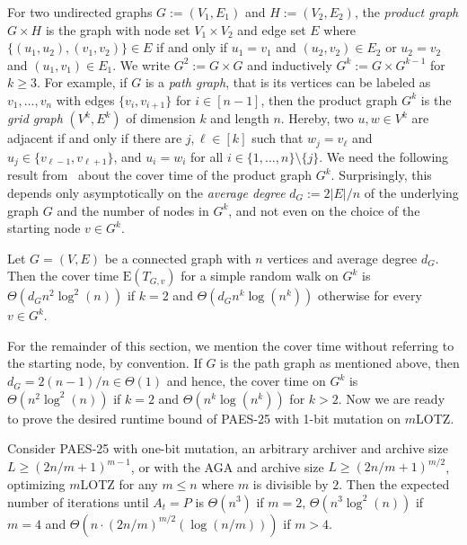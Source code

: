 \documentclass[
sigconf = false, %
review = false, %
screen = true, %
anonymous = true, %
format=acmsmall
]{acmart}
\newcommand{\mLOTZ}{\ensuremath{m}\text{-}\textsc{LOTZ}\xspace}
\newcommand*{\E}{\mathrm{E}}
\newcommand{\PAES}{PAES-25\xspace}
\begin{document}
For two undirected graphs $G:=(V_1,E_1)$ and $H:=(V_2,E_2)$, the \emph{product graph} $G \times H$ is the graph with node set $V_1 \times V_2$ and edge set $E$ where $\{(u_1,u_2),(v_1,v_2)\} \in E$ if and only if $u_1=v_1$ and $(u_2,v_2) \in E_2$ or $u_2 = v_2$ and $(u_1,v_1) \in E_1$. We write $G^2:=G \times G$ and inductively $G^k:=G \times G^{k-1}$ for $k \geq 3$. For example, if $G$ is a \emph{path graph}, that is its vertices can be labeled as $v_1, \ldots , v_n$ with edges $\{v_i,v_{i+1}\}$ for $i \in [n-1]$, then the product graph $G^k$ is the \emph{grid graph} $(V^k,E^k)$ of dimension $k$ and length $n$. Hereby, two $u,w \in V^k$ are adjacent if and only if there are $j,\ell \in [k]$ such that $w_j=v_\ell$ and $u_j \in \{v_{\ell-1},v_{\ell+1}\}$, and $u_i=w_i$ for all $i \in \{1,\ldots , n\} \setminus \{j\}$. We need the following result from~\citet{JONASSON2000181} about the cover time of the product graph $G^k$. Surprisingly, this depends only asymptotically on the \emph{average degree} $d_G:=2|E|/n$ of the underlying graph $G$ and the number of nodes in $G^k$, and not even on the choice of the starting node $v \in G^k$.

\begin{theorem}
Let $G=(V,E)$ be a connected graph with $n$ vertices and average degree $d_G$. Then the cover time $\E(T_{G,v})$ for a simple random walk on $G^k$ is $\Theta(d_G n^2 \log^2(n))$ if $k=2$ and $\Theta(d_G n^k \log(n^k))$ otherwise for every $v \in G^k$.  
\end{theorem}

For the remainder of this section, we mention the cover time without referring to the starting node, by convention. If $G$ is the path graph as mentioned above, then $d_G=2(n-1)/n \in \Theta(1)$ and hence, the cover time on $G^k$ is $\Theta(n^2 \log^2(n))$ if $k=2$ and $\Theta(n^k \log(n^k))$ for $k>2$. Now we are ready to prove the desired runtime bound of \PAES with 1-bit mutation on \mLOTZ.

\begin{theorem}
\label{thm:spreading-Pareto-front-Local}
Consider \PAES with one-bit mutation, an arbitrary archiver and archive size $L \geq (2n/m+1)^{m-1}$, or with the AGA and archive size $L \geq (2n/m+1)^{m/2}$, optimizing \mLOTZ for any $m \leq n$ where $m$ is divisible by $2$. Then the expected number of iterations until $A_t = P$ is $\Theta(n^3)$ if $m=2$, $\Theta(n^3\log^2(n))$ if $m = 4$ and $\Theta(n \cdot (2n/m)^{m/2}(\log(n/m)))$ if $m>4$.
\end{theorem}
\end{document}
